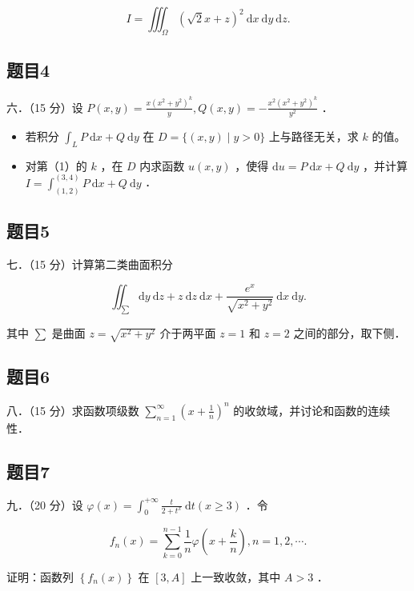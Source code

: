 \documentclass{article}
\begin{document}
\[
I=\iiint_{\Omega}(\sqrt{2} x+z)^{2} \mathrm{~d} x \mathrm{~d} y \mathrm{~d} z .
\]

\subsection{题目4}
六．（15 分）设 \(P(x, y)=\frac{x\left(x^{2}+y^{2}\right)^{k}}{y}, Q(x, y)=-\frac{x^{2}\left(x^{2}+y^{2}\right)^{k}}{y^{2}}\) ．

\begin{itemize}
  \item[（1）] 若积分 \(\int_{L} P \mathrm{~d} x+Q \mathrm{~d} y\) 在 \(D=\{(x, y) \mid y>0\}\) 上与路径无关，求 \(k\) 的值。
  \item[（2）] 对第（1）的 \(k\) ，在 \(D\) 内求函数 \(u(x, y)\) ，使得 \(\mathrm{d} u=P \mathrm{~d} x+Q \mathrm{~d} y\) ，并计算 \(I=\int_{(1,2)}^{(3,4)} P \mathrm{~d} x+Q \mathrm{~d} y\) ．
\end{itemize}

\subsection{题目5}
七．（15 分）计算第二类曲面积分

\[
\iint_{\sum} \mathrm{d} y \mathrm{~d} z+z \mathrm{~d} z \mathrm{~d} x+\frac{e^{x}}{\sqrt{x^{2}+y^{2}}} \mathrm{~d} x \mathrm{~d} y .
\]

其中 \(\sum\) 是曲面 \(z=\sqrt{x^{2}+y^{2}}\) 介于两平面 \(z=1\) 和 \(z=2\) 之间的部分，取下侧．

\subsection{题目6}
八．（15 分）求函数项级数 \(\sum_{n=1}^{\infty}\left(x+\frac{1}{n}\right)^{n}\) 的收敛域，并讨论和函数的连续性．

\subsection{题目7}
九．（20 分）设 \(\varphi(x)=\int_{0}^{+\infty} \frac{t}{2+t^{x}} \mathrm{~d} t(x \geq 3)\) ．令

\[
f_{n}(x)=\sum_{k=0}^{n-1} \frac{1}{n} \varphi\left(x+\frac{k}{n}\right), n=1,2, \cdots .
\]

证明：函数列 \(\left\{f_{n}(x)\right\}\) 在 \([3, A]\) 上一致收敛，其中 \(A>3\) ．
\end{document}
